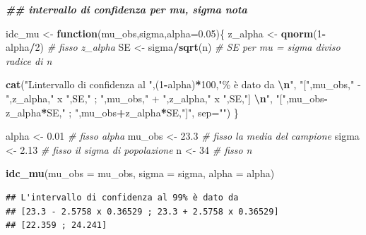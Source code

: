 \documentclass[
  11pt,
]{book}
\newenvironment{Shaded}{\begin{snugshade}}{\end{snugshade}}
\newcommand{\AttributeTok}[1]{\textcolor[rgb]{0.13,0.29,0.53}{#1}}
\newcommand{\CommentTok}[1]{\textcolor[rgb]{0.56,0.35,0.01}{\textit{#1}}}
\newcommand{\ControlFlowTok}[1]{\textcolor[rgb]{0.13,0.29,0.53}{\textbf{#1}}}
\newcommand{\DecValTok}[1]{\textcolor[rgb]{0.00,0.00,0.81}{#1}}
\newcommand{\DocumentationTok}[1]{\textcolor[rgb]{0.56,0.35,0.01}{\textbf{\textit{#1}}}}
\newcommand{\FloatTok}[1]{\textcolor[rgb]{0.00,0.00,0.81}{#1}}
\newcommand{\FunctionTok}[1]{\textcolor[rgb]{0.13,0.29,0.53}{\textbf{#1}}}
\newcommand{\NormalTok}[1]{#1}
\newcommand{\OtherTok}[1]{\textcolor[rgb]{0.56,0.35,0.01}{#1}}
\newcommand{\SpecialCharTok}[1]{\textcolor[rgb]{0.81,0.36,0.00}{\textbf{#1}}}
\newcommand{\StringTok}[1]{\textcolor[rgb]{0.31,0.60,0.02}{#1}}
\theoremstyle{mytheoremstyle}
\theoremstyle{mydefstyle}
\begin{document}
\begin{Shaded}
\begin{Highlighting}[]
\DocumentationTok{\#\# intervallo di confidenza per mu, sigma nota}

\NormalTok{idc\_mu }\OtherTok{\textless{}{-}} \ControlFlowTok{function}\NormalTok{(mu\_obs,sigma,}\AttributeTok{alpha=}\FloatTok{0.05}\NormalTok{)\{}
\NormalTok{z\_alpha }\OtherTok{\textless{}{-}} \FunctionTok{qnorm}\NormalTok{(}\DecValTok{1}\SpecialCharTok{{-}}\NormalTok{alpha}\SpecialCharTok{/}\DecValTok{2}\NormalTok{) }\CommentTok{\# fisso z\_alpha}
\NormalTok{SE      }\OtherTok{\textless{}{-}}\NormalTok{ sigma}\SpecialCharTok{/}\FunctionTok{sqrt}\NormalTok{(n) }\CommentTok{\# SE per mu = sigma diviso radice di n}

\FunctionTok{cat}\NormalTok{(}\StringTok{"L\textquotesingle{}intervallo di confidenza al "}\NormalTok{,(}\DecValTok{1}\SpecialCharTok{{-}}\NormalTok{alpha)}\SpecialCharTok{*}\DecValTok{100}\NormalTok{,}\StringTok{"\% è dato da }\SpecialCharTok{\textbackslash{}n}\StringTok{"}\NormalTok{,}
    \StringTok{"["}\NormalTok{,mu\_obs,}\StringTok{" {-} "}\NormalTok{,z\_alpha,}\StringTok{" x "}\NormalTok{,SE,}\StringTok{" ; "}\NormalTok{,mu\_obs,}\StringTok{" + "}\NormalTok{,z\_alpha,}\StringTok{" x "}\NormalTok{,SE,}\StringTok{"] }\SpecialCharTok{\textbackslash{}n}\StringTok{"}\NormalTok{,}
    \StringTok{"["}\NormalTok{,mu\_obs}\SpecialCharTok{{-}}\NormalTok{z\_alpha}\SpecialCharTok{*}\NormalTok{SE,}\StringTok{" ; "}\NormalTok{,mu\_obs}\SpecialCharTok{+}\NormalTok{z\_alpha}\SpecialCharTok{*}\NormalTok{SE,}\StringTok{"]"}\NormalTok{,}
    \AttributeTok{sep=}\StringTok{""}\NormalTok{)}
\NormalTok{\}}

\NormalTok{alpha   }\OtherTok{\textless{}{-}} \FloatTok{0.01}     \CommentTok{\# fisso alpha}
\NormalTok{mu\_obs  }\OtherTok{\textless{}{-}} \FloatTok{23.3}     \CommentTok{\# fisso la media del campione}
\NormalTok{sigma   }\OtherTok{\textless{}{-}} \FloatTok{2.13}     \CommentTok{\# fisso il sigma di popolazione}
\NormalTok{n       }\OtherTok{\textless{}{-}} \DecValTok{34}       \CommentTok{\# fisso n}

\FunctionTok{idc\_mu}\NormalTok{(}\AttributeTok{mu\_obs =}\NormalTok{ mu\_obs, }\AttributeTok{sigma =}\NormalTok{ sigma, }\AttributeTok{alpha =}\NormalTok{ alpha)}
\end{Highlighting}
\end{Shaded}

\begin{verbatim}
## L'intervallo di confidenza al 99% è dato da 
## [23.3 - 2.5758 x 0.36529 ; 23.3 + 2.5758 x 0.36529] 
## [22.359 ; 24.241]
\end{verbatim}
\end{document}
